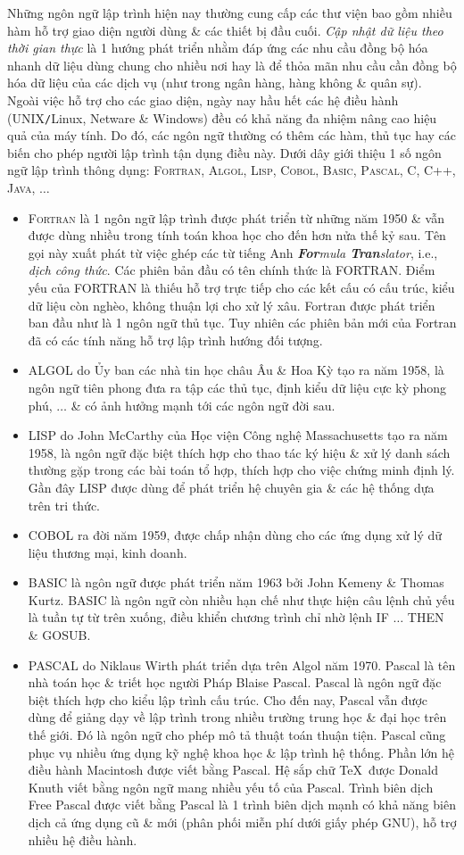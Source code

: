 \documentclass[oneside]{book}
\numberwithin{equation}{section}
\begin{document}
Những ngôn ngữ lập trình hiện nay thường cung cấp các thư viện bao gồm nhiều hàm hỗ trợ giao diện người dùng \& các thiết bị đầu cuối. \textit{Cập nhật dữ liệu theo thời gian thực} là 1 hướng phát triển nhằm đáp ứng các nhu cầu đồng bộ hóa nhanh dữ liệu dùng chung cho nhiều nơi hay là để thỏa mãn nhu cầu cần đồng bộ hóa dữ liệu của các dịch vụ (như trong ngân hàng, hàng không \& quân sự). Ngoài việc hỗ trợ cho các giao diện, ngày nay hầu hết các hệ điều hành (UNIX\texttt{/}Linux, Netware \& Windows) đều có khả năng đa nhiệm nâng cao hiệu quả của máy tính. Do đó, các ngôn ngữ thường có thêm các hàm, thủ tục hay các biến cho phép người lập trình tận dụng điều này. Dưới dây giới thiệu 1 số ngôn ngữ lập trình thông dụng: \textsc{Fortran, Algol, Lisp, Cobol, Basic, Pascal, C, C++, Java}, $\ldots$
\begin{itemize}
	\item \textsc{Fortran} là 1 ngôn ngữ lập trình được phát triển từ những năm 1950 \& vẫn được dùng nhiều trong tính toán khoa học cho đến hơn nửa thế kỷ sau. Tên gọi này xuất phát từ việc ghép các từ tiếng Anh \textit{\textbf{For}mula \textbf{Tran}slator}, i.e., \textit{dịch công thức}. Các phiên bản đầu có tên chính thức là FORTRAN. Điểm yếu của FORTRAN là thiếu hỗ trợ trực tiếp cho các kết cấu có cấu trúc, kiểu dữ liệu còn nghèo, không thuận lợi cho xử lý xâu. Fortran được phát triển ban đầu như là 1 ngôn ngữ thủ tục. Tuy nhiên các phiên bản mới của Fortran đã có các tính năng hỗ trợ lập trình hướng đối tượng.
	\item ALGOL do Ủy ban các nhà tin học châu Âu \& Hoa Kỳ tạo ra năm 1958, là ngôn ngữ tiên phong đưa ra tập các thủ tục, định kiểu dữ liệu cực kỳ phong phú, $\ldots$ \& có ảnh hưởng mạnh tới các ngôn ngữ đời sau.
	\item LISP do John McCarthy của Học viện Công nghệ Massachusetts tạo ra năm 1958, là ngôn ngữ đặc biệt thích hợp cho thao tác ký hiệu \& xử lý danh sách thường gặp trong các bài toán tổ hợp, thích hợp cho việc chứng minh định lý. Gần đây LISP được dùng để phát triển hệ chuyên gia \& các hệ thống dựa trên tri thức.
	\item COBOL ra đời năm 1959, được chấp nhận dùng cho các ứng dụng xử lý dữ liệu thương mại, kinh doanh.
	\item BASIC là ngôn ngữ được phát triển năm 1963 bởi John Kemeny \& Thomas Kurtz. BASIC là ngôn ngữ còn nhiều hạn chế như thực hiện câu lệnh chủ yếu là tuần tự từ trên xuống, điều khiển chương trình chỉ nhờ lệnh IF $\ldots$ THEN \& GOSUB.
	\item PASCAL do Niklaus Wirth phát triển dựa trên Algol năm 1970. Pascal là tên nhà toán học \& triết học người Pháp Blaise Pascal. Pascal là ngôn ngữ đặc biệt thích hợp cho kiểu lập trình cấu trúc. Cho đến nay, Pascal vẫn được dùng để giảng dạy về lập trình trong nhiều trường trung học \& đại học trên thế giới. Đó là ngôn ngữ cho phép mô tả thuật toán thuận tiện. Pascal cũng phục vụ nhiều ứng dụng kỹ nghệ khoa học \& lập trình hệ thống. Phần lớn hệ điều hành Macintosh được viết bằng Pascal. Hệ sắp chữ \TeX\ được Donald Knuth viết bằng ngôn ngữ mang nhiều yếu tố của Pascal. Trình biên dịch Free Pascal được viết bằng Pascal là 1 trình biên dịch mạnh có khả năng biên dịch cả ứng dụng cũ \& mới (phân phối miễn phí dưới giấy phép GNU), hỗ trợ nhiều hệ điều hành.

\end{itemize}
\end{document}
